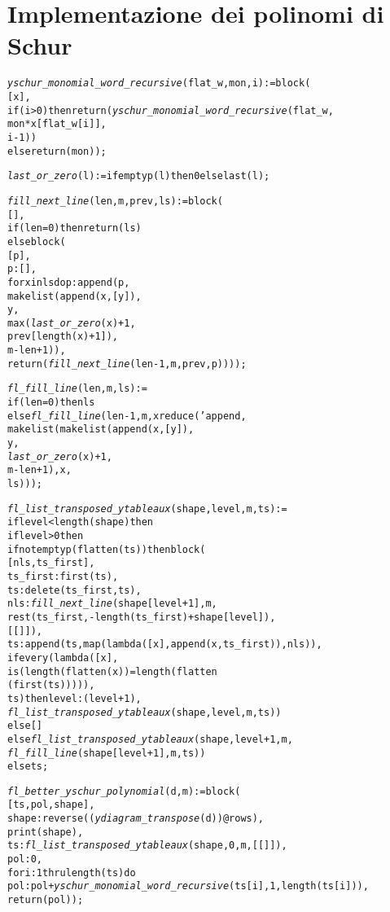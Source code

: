 \section{Implementazione dei polinomi di Schur}

\begin{alltt}
\emph{yschur\_monomial\_word\_recursive} (flat\_w, mon, i) := block (
  [x],
  if (i>0) then return (\emph{yschur\_monomial\_word\_recursive} (flat\_w,
                                                        mon*x[flat\_w[i]],
                                                        i-1))
  else return (mon));

\emph{last\_or\_zero} (l) := if emptyp (l) then 0 else last(l);


\emph{fill\_next\_line} (len, m, prev, ls) := block (
  [],
  if (len = 0) then return (ls)
  else block (
    [p],
    p : [],
    for x in ls do p : append (p,
                               makelist (append (x, [y]),
                               y,
                               max (\emph{last\_or\_zero} (x) + 1,
                                    prev[length (x)+1]),
                               m - len + 1)),
    return (\emph{fill\_next\_line} (len - 1, m, prev, p))));


\emph{fl\_fill\_line} (len, m, ls) :=
if (len=0) then ls
else \emph{fl\_fill\_line} (len-1, m, xreduce ('append, 
                                       makelist (makelist (append (x, [y]),
                                                 y,
                                                 \emph{last\_or\_zero} (x) + 1,
                                                 m - len +1), x,
                                                 ls)));

\emph{fl\_list\_transposed\_ytableaux} (shape, level, m, ts) :=
if level < length (shape) then
  if level > 0 then
    if not emptyp (flatten (ts)) then block (
      [nls,ts\_first],
      ts\_first : first (ts),
      ts : delete (ts\_first, ts),
      nls : \emph{fill\_next\_line} (shape [level+1], m,
                            rest (ts\_first, -length(ts\_first)+shape[level]),
                            [[]]),
      ts : append (ts, map (lambda ([x], append (x, ts\_first)), nls)),
      if every (lambda ([x],
                        is (length (flatten (x)) = length (flatten
                        (first (ts))))),
                ts) then level : (level + 1),
      \emph{fl\_list\_transposed\_ytableaux} (shape, level, m, ts))
    else []
  else \emph{fl\_list\_transposed\_ytableaux} (shape, level + 1, m,
                                     \emph{fl\_fill\_line} (shape[level + 1], m, ts))
else ts;

\emph{fl\_better\_yschur\_polynomial} (d, m) := block (
  [ts, pol, shape],
  shape : reverse ((\emph{ydiagram\_transpose} (d))@rows),
  print (shape),
  ts : \emph{fl\_list\_transposed\_ytableaux} (shape, 0, m, [[]]),
  pol : 0,
  for i : 1 thru length (ts) do
    pol : pol + \emph{yschur\_monomial\_word\_recursive} (ts[i], 1, length (ts[i])),
  return (pol));
\end{alltt}

